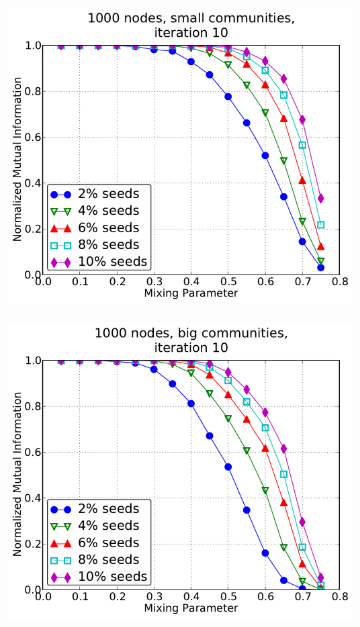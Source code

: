 %
\begin{figure}[h!]
    \centering
    \begin{subfigure}{0.5\textwidth}
    \centering
    \includegraphics[width=\appplotwidth]{plots/nonoverlap_iter_a.pdf}
    \end{subfigure}%
    \begin{subfigure}{0.5\textwidth}
    \centering
    \includegraphics[width=\appplotwidth]{plots/nonoverlap_iter_b.pdf}
    \end{subfigure}

\end{figure}
